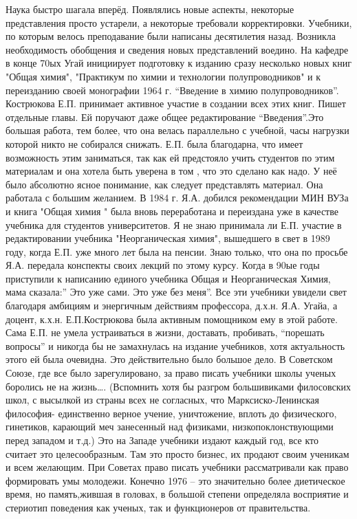 Наука быстро шагала вперёд. Появлялись новые аспекты, некоторые представления просто устарели, а некоторые требовали корректировки. Учебники, по которым велось преподавание были написаны десятилетия назад. Возникла необходимость обобщения и сведения новых представлений воедино. На кафедре в конце 70ых Угай инициирует подготовку к изданию сразу несколько новых книг "Общая химия", "Практикум по химии и технологии полупроводников" и к переизданию своей монографии 1964 г. “Введение в химию полупроводников”. Кострюкова Е.П. принимает активное участие в создании всех этих книг. Пишет отдельные главы. Ей поручают даже общее редактирование “Введения”.Это большая работа, тем более, что она велась параллельно с учебной, часы нагрузки которой никто не собирался снижать. Е.П. была благодарна, что имеет возможность этим заниматься, так как ей предстояло учить студентов по этим материалам и она хотела быть уверена в том , что это сделано как надо. У неё было абсолютно ясное понимание, как следует представлять материал. Она работала с большим желанием.
В 1984 г. Я.А. добился рекомендации МИН ВУЗа и книга "Общая химия " была вновь переработана и переиздана уже в качестве учебника для студентов университетов. Я не знаю принимала ли Е.П. участие в редактировании учебника "Неорганическая химия", вышедшего в свет в 1989 году, когда Е.П. уже много лет была на пенсии. Знаю только, что она по просьбе Я.А. передала конспекты своих лекций по этому курсу. Когда в 90ые годы приступили к написанию единого учебника Общая и Неорганическая Химия, мама сказала:” Это уже сами. Это уже без меня”. Все эти учебники увидели свет благодаря амбициям и энергичным действиям профессора, д.х.н. Я.А. Угайа, а доцент, к.х.н. Е.П.Кострюкова была активным помощником ему в этой работе.
Сама Е.П. не умела устраиваться в жизни, доставать, пробивать, “порешать вопросы” и никогда бы не замахнулась на  издание  учебников, хотя актуальность этого ей была очевидна. Это действительно было большое дело. В Советском Союзе, где все было зарегулировано, за право писать учебники школы ученых боролись не на жизнь…. (Вспомнить хотя бы разгром большивиками филосовских школ, с высылкой из страны всех не согласных, что Марксиско-Ленинская философия- единственно верное учение, уничтожение, вплоть до физического, гинетиков, карающий меч занесенный над физиками, низкопоклонствующими перед западом  и т.д.) Это на Западе учебники издают каждый год, все кто считает это целесообразным. Там это просто бизнес, их продают своим ученикам и всем желающим. При Советах право писать учебники рассматривали как право формировать умы молодежи. Конечно 1976 – это значительно более диетическое время, но память,жившая в головах, в большой степени определяла восприятие и стериотип поведения как ученых, так и функционеров от правительства.
